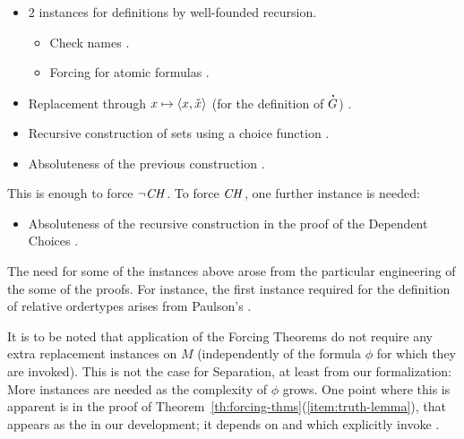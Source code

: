 \begin{itemize}
\item 2 instances for definitions by well-founded recursion.
  \begin{itemize}
  \item
    Check names
    .
  \item Forcing for atomic formulas
    .
  \end{itemize}
\item Replacement through $x\mapsto \langle x,\check{x}\rangle$ (for the
  definition of $\punto{G}$)
  .
\item Recursive construction of sets using a choice function
  .
\item Absoluteness of the previous construction .
\end{itemize}
%
This is enough to force $\neg\mathit{CH}$. To force $\mathit{CH}$, one further instance is needed:
%
\begin{itemize}
\item Absoluteness of the recursive construction in the proof of the
  Dependent Choices .
\end{itemize}

The need for some of the instances above arose from the particular
engineering of the some of the proofs. For instance, the first
instance required for the definition of relative ordertypes arises
from Paulson's .

It is to be noted that application of the Forcing Theorems do not
require any extra replacement instances on $M$ (independently of the
formula $\phi$ for which they are invoked). This is not the case for
Separation, at least from our formalization: More instances are needed
as the complexity of $\phi$ grows. One point where this is apparent is
in the proof of Theorem~\ref{th:forcing-thms}(\ref{item:truth-lemma}),
that appears as the  in our development; it
depends on  and
 which explicitly invoke
.

